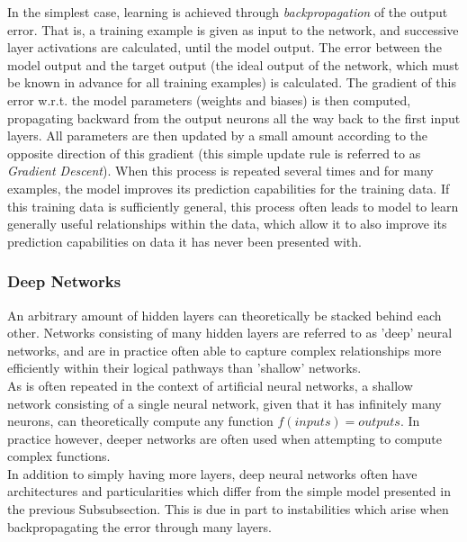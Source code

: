 In the simplest case, learning is achieved through \textit{backpropagation} of the output error. That is, a training example is given as input to the network, and successive layer activations are calculated, until the model output. The error between the model output and the target output (the ideal output of the network, which must be known in advance for all training examples) is calculated. The gradient of this error w.r.t. the model parameters (weights and biases) is then computed, propagating backward from the output neurons all the way back to the first input layers. All parameters are then updated by a small amount according to the opposite direction of this gradient (this simple update rule is referred to as \textit{Gradient Descent}). When this process is repeated several times and for many examples, the model improves its prediction capabilities for the training data. If this training data is sufficiently general, this process often leads to model to learn generally useful relationships within the data, which allow it to also improve its prediction capabilities on data it has never been presented with.\\

\subsubsection{Deep Networks}

An arbitrary amount of hidden layers can theoretically be stacked behind each other. Networks consisting of many hidden layers are referred to as 'deep' neural networks, and are in practice often able to capture complex relationships more efficiently within their logical pathways than 'shallow' networks.\\

As is often repeated in the context of artificial neural networks, a shallow network consisting of a single neural network, given that it has infinitely many neurons, can theoretically compute any function $f(inputs) = outputs$. In practice however, deeper networks are often used when attempting to compute complex functions.\\

In addition to simply having more layers, deep neural networks often have architectures and particularities which differ from the simple model presented in the previous Subsubsection. This is due in part to instabilities which arise when backpropagating the error through many layers.\\ 

